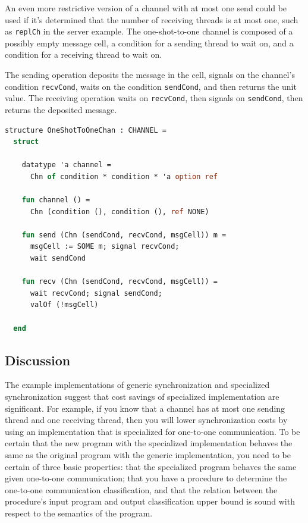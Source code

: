 \documentclass[letterpaper, 11pt]{extarticle}
\begin{document}
An even more restrictive version of a channel with at most one send could be used if it's
determined that the number of receiving threads is at most one,
such as \lstinline{replCh} in the server example.
The one-shot-to-one channel is
composed of a possibly empty message cell, a condition for a sending thread to wait on,
and a condition for a receiving thread to wait on.

The sending operation deposits the message in the cell, signals on the channel's condition \lstinline{recvCond},
waits on the condition \lstinline{sendCond}, and then returns the unit value.
The receiving operation waits on \lstinline{recvCond},
then signals on \lstinline{sendCond}, then returns the deposited message.

\begin{lstlisting}[language=ML, mathescape]
  structure OneShotToOneChan : CHANNEL =
  struct

    datatype 'a channel =
      Chn of condition * condition * 'a option ref

    fun channel () =
      Chn (condition (), condition (), ref NONE)

    fun send (Chn (sendCond, recvCond, msgCell)) m =
      msgCell := SOME m; signal recvCond;  
      wait sendCond

    fun recv (Chn (sendCond, recvCond, msgCell)) =
      wait recvCond; signal sendCond;
      valOf (!msgCell)

  end
\end{lstlisting}

\subsection{Discussion}
The example implementations of generic synchronization and specialized synchronization suggest
that cost savings of specialized implementation are significant. For example, if you know that
a channel has at most one sending thread and one receiving thread, then you will
lower synchronization costs by
using an implementation that is specialized for one-to-one communication.  To be certain that
the new program with the specialized implementation behaves the same as the original program
with the generic implementation, you need to be certain of three basic properties: that the
specialized program behaves the same given one-to-one communication; that you have a procedure
to determine the one-to-one communication classification, and that the relation between the
procedure's input program and output classification upper bound is sound with respect to the
semantics of the program.  
\end{document}
